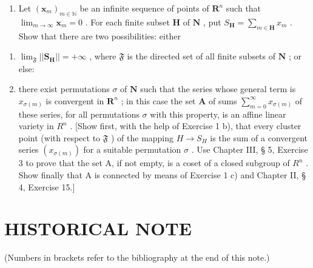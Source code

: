 \begin{enumerate}
\def\labelenumi{\arabic{enumi})}
\setcounter{enumi}{1}
\tightlist
\item
  Let \((\pmb{x}_m)_{m\in \mathbb{N}}\) be an infinite sequence of points of \(\mathbf{R}^n\) such that \(\lim_{m\to \infty}\pmb{x}_m = 0\) . For each finite subset \(\mathbf{H}\) of \(\mathbf{N}\) , put \(S_{\mathbf{H}} = \sum_{m\in \mathbf{H}}x_m\) . Show that there are two possibilities: either
\end{enumerate}

\begin{enumerate}
\def\labelenumi{(\roman{enumi})}
\item
  \(\lim_{\mathfrak{F}}||\mathbf{S}_{\mathbf{H}}|| = +\infty\) , where \(\mathfrak{F}\) is the directed set of all finite subsets of \(\mathbf{N}\) ; or else:
\item
  there exist permutations \(\sigma\) of \(\mathbf{N}\) such that the series whose general term is \(x_{\sigma(m)}\) is convergent in \(\mathbf{R}^n\) ; in this case the set \(\mathbf{A}\) of sums \(\sum_{m=0}^{\infty} x_{\sigma(m)}\) of these series, for all permutations \(\sigma\) with this property, is an affine linear variety in \(R^n\) . {[}Show first, with the help of Exercise 1 b), that every cluster point (with respect to \(\mathfrak{F}\) ) of the mapping \(H \to S_H\) is the sum of a convergent series \((x_{\sigma(m)})\) for a suitable permutation \(\sigma\) . Use Chapter III, § 5, Exercise 3 to prove that the set A, if not empty, is a coset of a closed subgroup of \(R^n\) . Show finally that A is connected by means of Exercise 1 c) and Chapter II, § 4, Exercise 15.{]}
\end{enumerate}

\section*{HISTORICAL NOTE}
{}

(Numbers in brackets refer to the bibliography at the end of this note.)

